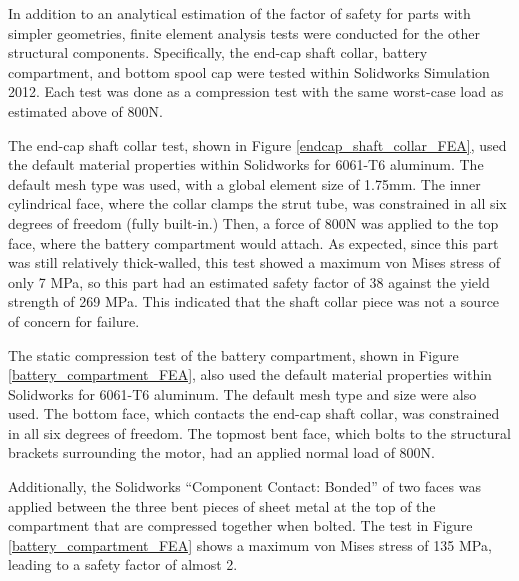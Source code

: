 \documentclass[12pt]{report}
\begin{document}
In addition to an analytical estimation of the factor of safety for parts with simpler geometries, finite element analysis tests were conducted for the other structural components.
Specifically, the end-cap shaft collar, battery compartment, and bottom spool cap were tested within Solidworks Simulation 2012.
Each test was done as a compression test with the same worst-case load as estimated above of 800N.



The end-cap shaft collar test, shown in Figure \ref{endcap_shaft_collar_FEA}, used the default material properties within Solidworks for 6061-T6 aluminum.
The default mesh type was used, with a global element size of 1.75mm.
The inner cylindrical face, where the collar clamps the strut tube, was constrained in all six degrees of freedom (fully built-in.)
Then, a force of 800N was applied to the top face, where the battery compartment would attach.
As expected, since this part was still relatively thick-walled, this test showed a maximum von Mises stress of only 7 MPa, so this part had an estimated safety factor of 38 against the yield strength of 269 MPa.
This indicated that the shaft collar piece was not a source of concern for failure.

The static compression test of the battery compartment, shown in Figure \ref{battery_compartment_FEA}, also used the default material properties within Solidworks for 6061-T6 aluminum. 
The default mesh type and size were also used.
The bottom face, which contacts the end-cap shaft collar, was constrained in all six degrees of freedom.
The topmost bent face, which bolts to the structural brackets surrounding the motor, had an applied normal load of 800N.



Additionally, the Solidworks ``Component Contact: Bonded'' of two faces was applied between the three bent pieces of sheet metal at the top of the compartment that are compressed together when bolted.
The test in Figure \ref{battery_compartment_FEA} shows a maximum von Mises stress of 135 MPa, leading to a safety factor of almost 2.

\end{document}
